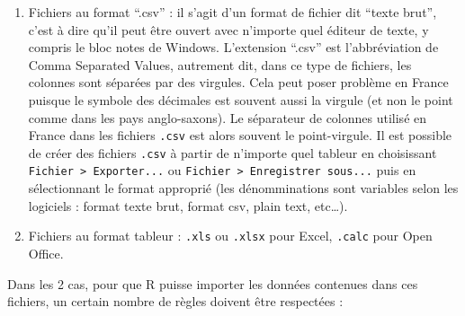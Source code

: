 \documentclass[
  a4paper,
]{article}
\providecommand{\tightlist}{%
  \setlength{\itemsep}{0pt}\setlength{\parskip}{0pt}}
\begin{document}
\begin{enumerate}
\def\labelenumi{\arabic{enumi}.}
\tightlist
\item
  Fichiers au format ``.csv'' : il s'agit d'un format de fichier dit ``texte brut'', c'est à dire qu'il peut être ouvert avec n'importe quel éditeur de texte, y compris le bloc notes de Windows. L'extension ``.csv'' est l'abbréviation de Comma Separated Values, autrement dit, dans ce type de fichiers, les colonnes sont séparées par des virgules. Cela peut poser problème en France puisque le symbole des décimales est souvent aussi la virgule (et non le point comme dans les pays anglo-saxons). Le séparateur de colonnes utilisé en France dans les fichiers \texttt{.csv} est alors souvent le point-virgule. Il est possible de créer des fichiers \texttt{.csv} à partir de n'importe quel tableur en choisissant \texttt{Fichier\ \textgreater{}\ Exporter...} ou \texttt{Fichier\ \textgreater{}\ Enregistrer\ sous...} puis en sélectionnant le format approprié (les dénomminations sont variables selon les logiciels : format texte brut, format csv, plain text, etc\ldots).
\item
  Fichiers au format tableur : \texttt{.xls} ou \texttt{.xlsx} pour Excel, \texttt{.calc} pour Open Office.
\end{enumerate}

Dans les 2 cas, pour que R puisse importer les données contenues dans ces fichiers, un certain nombre de règles doivent être respectées :
\end{document}
